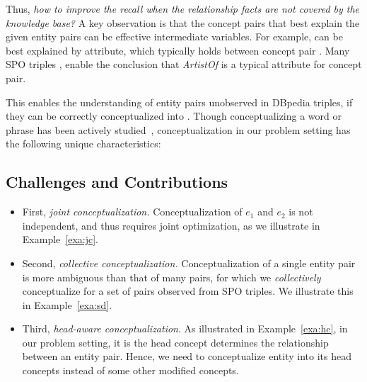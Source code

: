 Thus, {\it how to improve the recall when the relationship facts are not covered by the knowledge base?}
A key observation is that the concept pairs
that best explain the given entity pairs can be effective intermediate 
variables. 
For example,  can be best explained by  attribute, 
which typically holds between concept pair . 
Many SPO triples , 
enable the conclusion that \emph{ArtistOf} is a typical attribute for  concept pair.

This enables the understanding of entity pairs unobserved in DBpedia triples, if they can be correctly conceptualized into .
Though conceptualizing a word or phrase has been actively studied~\cite{song2011short,kim2013context}, conceptualization in our problem setting has the following unique characteristics:


\subsection{Challenges and Contributions}

\begin{itemize}
\item First,  {\it joint conceptualization.} Conceptualization of
$e_1$ and $e_2$ is not independent, and thus requires joint optimization, 
as we illustrate in Example~\ref{exa:jc}.
\item Second, {\it collective conceptualization.} 
Conceptualization of a single entity pair is more ambiguous than that of many pairs, for which we \emph{collectively} conceptualize for a set of pairs observed from SPO triples.
We illustrate this in Example~\ref{exa:sd}.
\item Third, {\it head-aware conceptualization}. As illustrated in Example~\ref{exa:hc}, in our problem setting, it is the head concept determines the relationship between an entity pair. Hence, we need to conceptualize entity into its head concepts instead of some other modified concepts. 
\end{itemize}

